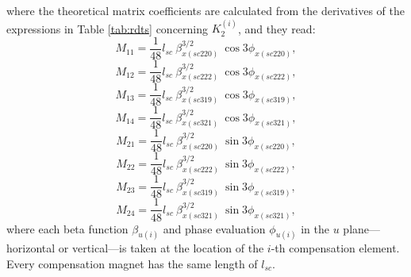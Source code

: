 where the theoretical matrix coefficients are calculated from the derivatives of the expressions in Table \ref{tab:rdts} concerning $K_2^{(i)}$, and they read: 
\begin{equation}
    M_{11}=\frac{1}{48} l_{sc} \: \beta^{3/2}_{x(sc220)} \: \cos 3\phi_{x(sc220)},
    \label{eq:M11}
\end{equation}
\begin{equation}
    M_{12}=\frac{1}{48} l_{sc} \: \beta^{3/2}_{x(sc222)} \: \cos 3\phi_{x(sc222)},
    \label{eq:M12}
\end{equation}
\begin{equation}
    M_{13}=\frac{1}{48} l_{sc} \: \beta^{3/2}_{x(sc319)} \: \cos 3\phi_{x(sc319)},
    \label{eq:M13}
\end{equation}
\begin{equation}
    M_{14}=\frac{1}{48} l_{sc} \: \beta^{3/2}_{x(sc321)} \: \cos 3\phi_{x(sc321)},
    \label{eq:M14}
\end{equation}
\begin{equation}
    M_{21}=\frac{1}{48} l_{sc} \: \beta^{3/2}_{x(sc220)} \: \sin 3\phi_{x(sc220)},
    \label{eq:M21}
\end{equation}
\begin{equation}
    M_{22}=\frac{1}{48} l_{sc} \: \beta^{3/2}_{x(sc222)} \: \sin 3\phi_{x(sc222)},
    \label{eq:M22}
\end{equation}
\begin{equation}
    M_{23}=\frac{1}{48} l_{sc} \: \beta^{3/2}_{x(sc319)} \: \sin 3\phi_{x(sc319)},
    \label{eq:M23}
\end{equation}
\begin{equation}
    M_{24}=\frac{1}{48} l_{sc} \: \beta^{3/2}_{x(sc321)} \: \sin 3\phi_{x(sc321)},
    \label{eq:M24}
\end{equation}
where each beta function $\beta_{u(i)}$ and phase evaluation $\phi_{u(i)}$ in the $u$ plane---horizontal or vertical---is taken at the location of the $i$-th compensation element. Every compensation magnet has the same length of $l_{sc}$.

